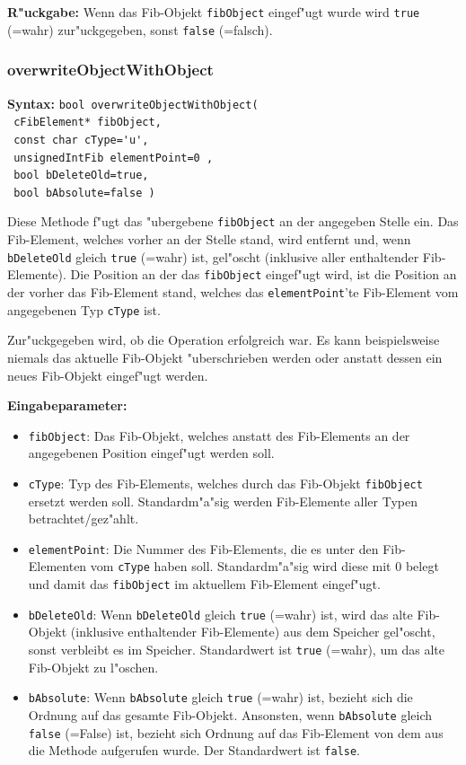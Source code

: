 \bigskip\noindent
\textbf{R"uckgabe:} Wenn das Fib-Objekt \verb|fibObject| eingef"ugt wurde wird \verb|true| (=wahr) zur"uckgegeben, sonst \verb|false| (=falsch).


\subsubsection{overwriteObjectWithObject}

\textbf{Syntax:} \verb|bool overwriteObjectWithObject(| \\\verb| cFibElement* fibObject,| \\\verb| const char cType='u',| \\\verb| unsignedIntFib elementPoint=0 ,| \\\verb| bool bDeleteOld=true,| \\\verb| bool bAbsolute=false )|

\bigskip\noindent
Diese Methode f"ugt das "ubergebene \verb|fibObject| an der angegeben Stelle ein. Das Fib-Element, welches vorher an der Stelle stand, wird entfernt und, wenn \verb|bDeleteOld| gleich \verb|true| (=wahr) ist, gel"oscht (inklusive aller enthaltender Fib-Elemente). Die Position an der das \verb|fibObject| eingef"ugt wird, ist die Position an der vorher das Fib-Element stand, welches das \verb|elementPoint|'te Fib-Element vom angegebenen Typ \verb|cType| ist.

Zur"uckgegeben wird, ob die Operation erfolgreich war. Es kann beispielsweise niemals das aktuelle Fib-Objekt "uberschrieben werden oder anstatt dessen ein neues Fib-Objekt eingef"ugt werden.

\bigskip\noindent
\textbf{Eingabeparameter:}
\begin{itemize}
 \item \verb|fibObject|: Das Fib-Objekt, welches anstatt des Fib-Elements an der angegebenen Position eingef"ugt werden soll.
 \item \verb|cType|: Typ des Fib-Elements, welches durch das Fib-Objekt \verb|fibObject| ersetzt werden soll. Standardm"a"sig werden Fib-Elemente aller Typen betrachtet/gez"ahlt.
 \item \verb|elementPoint|: Die Nummer des Fib-Elements, die es unter den Fib-Elementen vom \verb|cType| haben soll. Standardm"a"sig wird diese mit $0$ belegt und damit das \verb|fibObject| im aktuellem Fib-Element eingef"ugt.
 \item \verb|bDeleteOld|: Wenn \verb|bDeleteOld| gleich \verb|true| (=wahr) ist, wird das alte Fib-Objekt (inklusive enthaltender Fib-Elemente) aus dem Speicher gel"oscht, sonst verbleibt es im Speicher. Standardwert ist \verb|true| (=wahr), um das alte Fib-Objekt zu l"oschen.
 \item \verb|bAbsolute|: Wenn \verb|bAbsolute| gleich \verb|true| (=wahr) ist, bezieht sich die Ordnung auf das gesamte Fib-Objekt. Ansonsten, wenn \verb|bAbsolute| gleich \verb|false| (=False) ist, bezieht sich Ordnung auf das Fib-Element von dem aus die Methode aufgerufen wurde. Der Standardwert ist \verb|false|.
\end{itemize}

